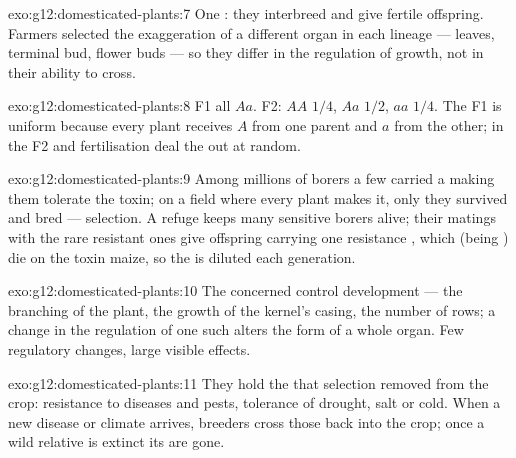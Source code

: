 \begin{solution}{exo:g12:domesticated-plants:7}
One : they interbreed and give fertile offspring. Farmers
selected the exaggeration of a different organ in each lineage ---
leaves, terminal bud, flower buds --- so they differ in the regulation
of growth, not in their ability to cross.
\end{solution}

\begin{solution}{exo:g12:domesticated-plants:8}
F1 all $Aa$. F2: $AA$ $1/4$, $Aa$ $1/2$, $aa$ $1/4$. The F1 is uniform
because every plant receives $A$ from one parent and $a$ from the
other; in the F2  and fertilisation deal the  out at
random.
\end{solution}

\begin{solution}{exo:g12:domesticated-plants:9}
Among millions of borers a few carried a  making them tolerate
the toxin; on a field where every plant makes it, only they survived
and bred --- selection. A refuge keeps many sensitive borers alive;
their matings with the rare resistant ones give offspring carrying one
resistance , which (being ) die on the toxin maize, so
the  is diluted each generation.
\end{solution}

\begin{solution}{exo:g12:domesticated-plants:10}
The  concerned control development --- the branching of the
plant, the growth of the kernel's casing, the number of rows; a change
in the regulation of one such  alters the form of a whole organ.
Few regulatory changes, large visible effects.
\end{solution}

\begin{solution}{exo:g12:domesticated-plants:11}
They hold the  that selection removed from the crop: resistance
to diseases and pests, tolerance of drought, salt or cold. When a new
disease or climate arrives, breeders cross those  back into the
crop; once a wild relative is extinct its  are gone.
\end{solution}


